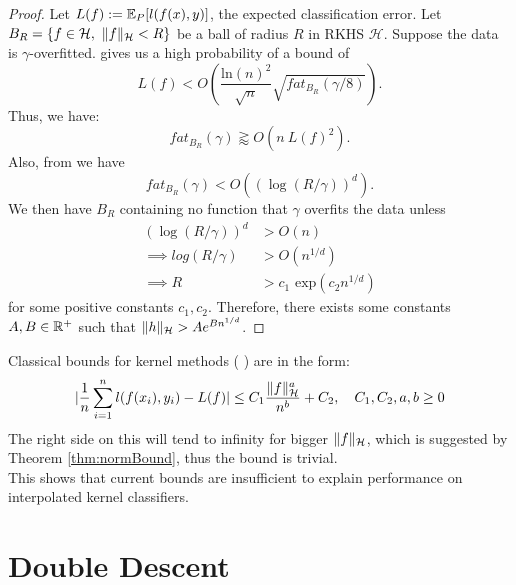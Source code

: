 \documentclass[twoside]{memoir}
\begin{document}
\begin{proof}
	Let $L(f) := \mathbb{E}_P[l(f(x), y)]$, the expected classification error.
	Let $B_R = \{ f \in \mathcal{H},~ \lVert f\rVert_\mathcal{H} < R \}$ be a ball of radius $R$ in RKHS $\mathcal{H}$. Suppose the data is $\gamma$-overfitted. \cite{LossFATBound} gives us a high probability of a bound of
	\[ L(f) < O(\frac{\text{ln}(n)^2}{\sqrt{n}}\sqrt{fat_{B_R}(\gamma/8)}). \] Thus, we have:
	\[ fat_{B_R}(\gamma) \gtrapprox O(n ~L(f)^2). \]
	Also, from \cite{ApproximationConcentration} we have \[fat_{B_R}(\gamma) < O((\log(R/\gamma))^d).\]
	We then have $B_R$ containing no function that $\gamma$ overfits the data unless
	\begin{equation*}
	\begin{split}
	(\log(R/\gamma))^d &> O(n) \\
	\implies log(R/\gamma) &> O(n^{1/d}) \\
	\implies R &> c_1 \text{ exp}(c_2n^{1/d})
	\end{split}
	\end{equation*}
	for some positive constants $c_1, c_2$. Therefore, there exists some constants $A, B \in \mathbb{R}^+$ such that $\lVert h\rVert_{\mathcal{H}} > Ae^{Bn^{1/d}}$. 
\end{proof}
Classical bounds for kernel methods (\cite{UnderstandKernel,steinwartSVM, Rudi_2015} ) are in the form:
\[ \lvert\frac{1}{n} \sum_{i=1}^{n}l(f(x_i),y_i) - L(f)\rvert \leq C_1 \frac{\lVert f\rVert^a_\mathcal{H}}{n^b} + C_2, \hspace{1em} C_1, C_2,a,b \geq 0 \]
The right side on this will tend to infinity for bigger $\lVert f\rVert_\mathcal{H}$, which is suggested by Theorem \ref{thm:normBound}, thus the bound is trivial.\\
This shows that current bounds are insufficient to explain performance on interpolated kernel classifiers.

\chapter{Double Descent}
\end{document}

